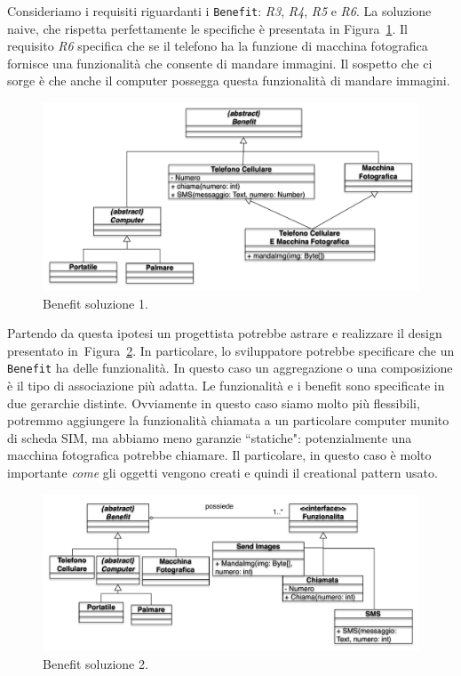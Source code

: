 \documentclass{article}
\begin{document}
Consideriamo i requisiti riguardanti i \texttt{Benefit}: \emph{R3}, \emph{R4}, \emph{R5} e \emph{R6}. La soluzione naive, che rispetta perfettamente le specifiche \`e presentata in Figura~\ref{Fig:benefit1}.  Il requisito \emph{R6} specifica che se il telefono ha la funzione di macchina fotografica fornisce una funzionalit\`a che consente di mandare immagini. Il sospetto che ci sorge \`e che anche il computer possegga questa funzionalit\`a di mandare immagini.

\begin{figure}[h!]
  \centering
    \includegraphics[width=1\textwidth]{Img/benefit1.pdf}
    \caption{Benefit soluzione 1.}
      \label{Fig:benefit1}
\end{figure}
Partendo da questa ipotesi un progettista potrebbe astrare e realizzare il design presentato in~Figura~\ref{Fig:benefit2}. In particolare, lo sviluppatore potrebbe specificare che un \texttt{Benefit} ha delle funzionalit\`a. In questo caso un aggregazione o una composizione \`e il tipo di associazione pi\`u adatta. Le funzionalit\`a e i benefit sono specificate in due gerarchie distinte. Ovviamente in questo caso siamo molto pi\`u flessibili, potremmo aggiungere la funzionalit\`a chiamata a un particolare computer munito di scheda SIM, ma abbiamo meno garanzie ``statiche": potenzialmente una macchina fotografica potrebbe chiamare. Il particolare, in questo caso \`e molto importante \emph{come} gli oggetti vengono creati e quindi il creational pattern usato.
\begin{figure}[h!]
  \centering
    \includegraphics[width=1\textwidth]{Img/benefit2.pdf}
    \caption{Benefit soluzione 2.}
      \label{Fig:benefit2}
\end{figure}
\end{document}
